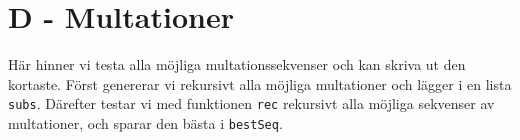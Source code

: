 \section*{D - Multationer}
Här hinner vi testa alla möjliga multationssekvenser och kan skriva ut den kortaste.
Först genererar vi rekursivt alla möjliga multationer och lägger i en lista \texttt{subs}.
Därefter testar vi med funktionen \texttt{rec} rekursivt alla möjliga sekvenser av multationer, och sparar den bästa i \texttt{bestSeq}.

